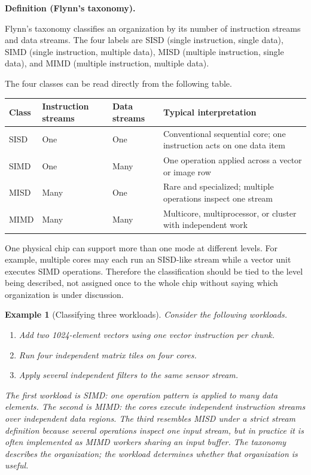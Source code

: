 \documentclass[11pt]{article}
\newtheorem{example}{Example}[section]
\newenvironment{definitionbox}[1]{%
  \par\noindent\textbf{Definition (#1).}\ \itshape
}{\par\vspace{0.3em}}
\begin{document}
\begin{definitionbox}{Flynn's taxonomy}
Flynn's taxonomy classifies an organization by its number of instruction
streams and data streams. The four labels are SISD (single instruction,
single data), SIMD (single instruction, multiple data), MISD (multiple
instruction, single data), and MIMD (multiple instruction, multiple data).
\end{definitionbox}

The four classes can be read directly from the following table.
\begin{center}
\begin{tabular}{@{}>{\raggedright\arraybackslash}p{1.5cm}>{\raggedright\arraybackslash}p{3.0cm}>{\raggedright\arraybackslash}p{3.0cm}>{\raggedright\arraybackslash}p{5.0cm}@{}}
\toprule
\textbf{Class} & \textbf{Instruction streams} & \textbf{Data streams} &
\textbf{Typical interpretation} \\
\midrule
SISD & One & One & Conventional sequential core; one instruction acts on one data item \\
SIMD & One & Many & One operation applied across a vector or image row \\
MISD & Many & One & Rare and specialized; multiple operations inspect one stream \\
MIMD & Many & Many & Multicore, multiprocessor, or cluster with independent work \\
\bottomrule
\end{tabular}
\end{center}

One physical chip can support more than one mode at different levels. For
example, multiple cores may each run an SISD-like stream while a vector unit
executes SIMD operations. Therefore the classification should be tied to the
level being described, not assigned once to the whole chip without saying
which organization is under discussion.

\begin{example}[Classifying three workloads]
\label{ex:flynn}
Consider the following workloads.
\begin{enumerate}
  \item Add two 1024-element vectors using one vector instruction per chunk.
  \item Run four independent matrix tiles on four cores.
  \item Apply several independent filters to the same sensor stream.
\end{enumerate}
The first workload is SIMD: one operation pattern is applied to many data
elements. The second is MIMD: the cores execute independent instruction
streams over independent data regions. The third resembles MISD under a
strict stream definition because several operations inspect one input stream,
but in practice it is often implemented as MIMD workers sharing an input
buffer. The taxonomy describes the organization; the workload determines
whether that organization is useful.
\end{example}
\end{document}
